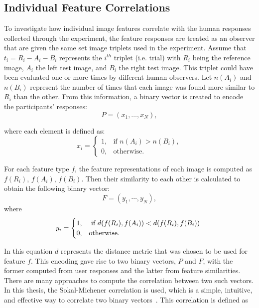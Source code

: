 \subsection{Individual Feature Correlations}
To investigate how individual image features correlate with the human responses collected through the experiment, the feature responses are treated as an observer that are given the same set image triplets used in the experiment. Assume that $t_i = R_i-A_i-B_i$ represents the $i^{th}$ triplet (i.e. trial) with $R_i$ being the reference image, $A_i$ the left test image, and $B_i$ the right test image. This triplet could have been evaluated one or more times by different human observers. Let $n(A_i)$ and $n(B_i)$ represent the number of times that each image was found more similar to $R_i$ than the other. From this information, a binary vector is created to encode the participants’ responses:
\begin{equation}
\label{eq:p_vector}
P = (x_1, \ldots, x_N),
\end{equation}

where each element is defined as:
\begin{equation}
x_i = \begin{cases}
1, &\text{if $n(A_i) > n(B_i)$}, \\
0, &\text{otherwise}.
\end{cases}
\end{equation}

For each feature type $f$, the feature representations of each image is computed as $f(R_i)$, $f(A_i)$, $f(B_i)$. Then their similarity to each other is calculated to obtain the following binary vector:
\begin{equation}
    F = (y_1,\cdots, y_N ),
\end{equation}
where
\begin{equation}
y_i = \begin{cases}
1, &\text{ if $ d(f(R_i), f(A_i)) < d(f(R_i), f(B_i))$ } \\
0, &\text{otherwise}.
\end{cases}
\end{equation}

In this equation $d$ represents the distance metric that was chosen to be used for feature $f$. This encoding gave rise to two binary vectors, $P$ and $F$, with the former computed from user responses and the latter from feature similarities. There are many approaches to compute the correlation between two such vectors. In this thesis, the Sokal-Michener correlation is used, which is a simple, intuitive, and effective way to correlate two binary vectors~\cite{zhang2003properties}. This correlation is defined as

